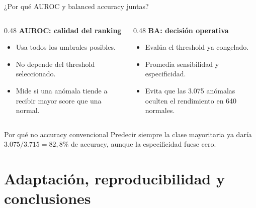 \documentclass[10pt,aspectratio=169]{beamer}
\begin{document}
\begin{frame}{¿Por qué AUROC y balanced accuracy juntas?}
  \begin{columns}[T]
    \begin{column}{0.48\textwidth}
      \textbf{AUROC: calidad del ranking}
      \begin{itemize}
        \item Usa todos los umbrales posibles.
        \item No depende del threshold seleccionado.
        \item Mide si una anómala tiende a recibir mayor score que una normal.
      \end{itemize}
    \end{column}
    \begin{column}{0.48\textwidth}
      \textbf{BA: decisión operativa}
      \begin{itemize}
        \item Evalúa el threshold ya congelado.
        \item Promedia sensibilidad y especificidad.
        \item Evita que las 3.075 anómalas oculten el rendimiento en 640 normales.
      \end{itemize}
    \end{column}
  \end{columns}

  \begin{block}{Por qué no accuracy convencional}
    Predecir siempre la clase mayoritaria ya daría $3.075/3.715=82{,}8\%$ de
    accuracy, aunque la especificidad fuese cero.
  \end{block}
\end{frame}

\section{Adaptación, reproducibilidad y conclusiones}
\end{document}
